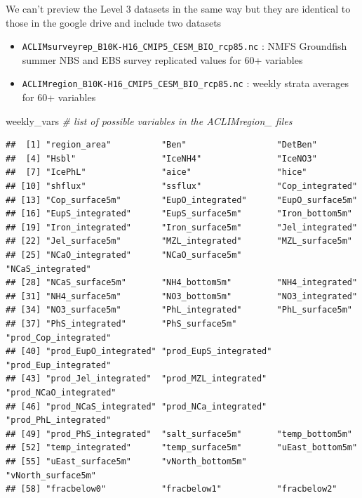 \documentclass[
]{article}
\newenvironment{Shaded}{\begin{snugshade}}{\end{snugshade}}
\newcommand{\CommentTok}[1]{\textcolor[rgb]{0.56,0.35,0.01}{\textit{#1}}}
\newcommand{\NormalTok}[1]{#1}
\providecommand{\tightlist}{%
  \setlength{\itemsep}{0pt}\setlength{\parskip}{0pt}}
\begin{document}
We can't preview the Level 3 datasets in the same way but they are
identical to those in the google drive and include two datasets

\begin{itemize}
\tightlist
\item
  \texttt{ACLIMsurveyrep\_B10K-H16\_CMIP5\_CESM\_BIO\_rcp85.nc} : NMFS
  Groundfish summer NBS and EBS survey replicated values for 60+
  variables
\item
  \texttt{ACLIMregion\_B10K-H16\_CMIP5\_CESM\_BIO\_rcp85.nc} : weekly
  strata averages for 60+ variables
\end{itemize}

\begin{Shaded}
\begin{Highlighting}[]
\NormalTok{    weekly_vars  }\CommentTok{# list of possible variables in the ACLIMregion_ files }
\end{Highlighting}
\end{Shaded}

\begin{verbatim}
##  [1] "region_area"          "Ben"                  "DetBen"              
##  [4] "Hsbl"                 "IceNH4"               "IceNO3"              
##  [7] "IcePhL"               "aice"                 "hice"                
## [10] "shflux"               "ssflux"               "Cop_integrated"      
## [13] "Cop_surface5m"        "EupO_integrated"      "EupO_surface5m"      
## [16] "EupS_integrated"      "EupS_surface5m"       "Iron_bottom5m"       
## [19] "Iron_integrated"      "Iron_surface5m"       "Jel_integrated"      
## [22] "Jel_surface5m"        "MZL_integrated"       "MZL_surface5m"       
## [25] "NCaO_integrated"      "NCaO_surface5m"       "NCaS_integrated"     
## [28] "NCaS_surface5m"       "NH4_bottom5m"         "NH4_integrated"      
## [31] "NH4_surface5m"        "NO3_bottom5m"         "NO3_integrated"      
## [34] "NO3_surface5m"        "PhL_integrated"       "PhL_surface5m"       
## [37] "PhS_integrated"       "PhS_surface5m"        "prod_Cop_integrated" 
## [40] "prod_EupO_integrated" "prod_EupS_integrated" "prod_Eup_integrated" 
## [43] "prod_Jel_integrated"  "prod_MZL_integrated"  "prod_NCaO_integrated"
## [46] "prod_NCaS_integrated" "prod_NCa_integrated"  "prod_PhL_integrated" 
## [49] "prod_PhS_integrated"  "salt_surface5m"       "temp_bottom5m"       
## [52] "temp_integrated"      "temp_surface5m"       "uEast_bottom5m"      
## [55] "uEast_surface5m"      "vNorth_bottom5m"      "vNorth_surface5m"    
## [58] "fracbelow0"           "fracbelow1"           "fracbelow2"
\end{verbatim}
\end{document}
